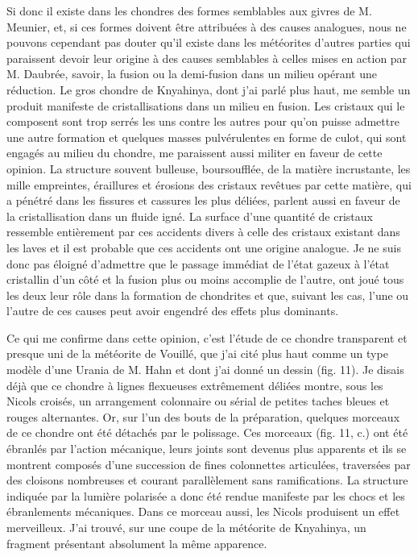 \documentclass[a4paper, 12pt, oneside, french]{article}
\begin{document}
Si donc il existe dans les chondres des formes semblables aux givres de M. Meunier, et, si ces formes doivent être attribuées à des causes analogues, nous ne pouvons cependant pas douter qu'il existe dans les météorites d'autres parties qui paraissent devoir leur origine à des causes semblables à celles mises en action par M. Daubrée, savoir, la fusion ou la demi-fusion dans un milieu opérant une réduction. Le gros chondre de Knyahinya, dont j'ai parlé plus haut, me semble un produit manifeste de cristallisations dans un milieu en fusion. Les cristaux qui le composent sont trop serrés les uns contre les autres pour qu'on puisse admettre une autre formation et quelques masses pulvérulentes en forme de culot, qui sont engagés au milieu du chondre, me paraissent aussi militer en faveur de cette opinion. La structure souvent bulleuse, boursoufflée, de la matière incrustante, les mille empreintes, éraillures et érosions des cristaux revêtues par cette matière, qui a pénétré dans les fissures et cassures les plus déliées, parlent aussi en faveur de la cristallisation dans un fluide igné. La surface d'une quantité de cristaux ressemble entièrement par ces accidents divers à celle des cristaux existant dans les laves et il est probable que ces accidents ont une origine analogue. Je ne suis donc pas éloigné d'admettre que le passage immédiat de l'état gazeux à l'état cristallin d'un côté et la fusion plus ou moins accomplie de l'autre, ont joué tous les deux leur rôle dans la formation de chondrites et que, suivant les cas, l'une ou l'autre de ces causes peut avoir engendré des effets plus dominants.

Ce qui me confirme dans cette opinion, c'est l'étude de ce chondre transparent et presque uni de la météorite de Vouillé, que j'ai cité plus haut comme un type modèle d'une Urania de M. Hahn et dont j'ai donné un dessin (fig. 11). Je disais déjà que ce chondre à lignes flexueuses extrêmement déliées montre, sous les Nicols croisés, un arrangement colonnaire ou sérial de petites taches bleues et rouges alternantes. Or, sur l'un des bouts de la préparation, quelques morceaux de ce chondre ont été détachés par le polissage. Ces morceaux (fig. 11, c.) ont été ébranlés par l'action mécanique, leurs joints sont devenus plus apparents et ils se montrent composés d'une succession de fines colonnettes articulées, traversées par des cloisons nombreuses et courant parallèlement sans ramifications. La structure indiquée par la lumière polarisée a donc été rendue manifeste par les chocs et les ébranlements mécaniques. Dans ce morceau aussi, les Nicols produisent un effet merveilleux. J'ai trouvé, sur une coupe de la météorite de Knyahinya, un fragment présentant absolument la même apparence.
\end{document}
